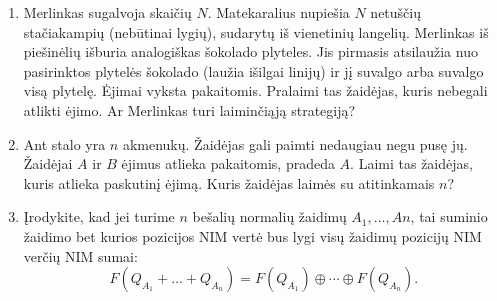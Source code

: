 \begin{enumerate}


  \item Merlinkas sugalvoja skaičių $N$. Matekaralius nupiešia $N$
    netuščių stačiakampių (nebūtinai lygių), sudarytų iš vienetinių langelių.
    Merlinkas iš piešinėlių išburia analogiškas šokolado plyteles.
    Jis pirmasis atsilaužia nuo pasirinktos plytelės šokolado (laužia išilgai
    linijų) ir jį suvalgo arba suvalgo visą plytelę. Ėjimai vyksta
    pakaitomis. Pralaimi tas žaidėjas, kuris nebegali atlikti ėjimo.  Ar
    Merlinkas turi laiminčiąją strategiją?  

  \item Ant stalo yra $n$ akmenukų. Žaidėjas gali paimti nedaugiau negu pusę
    jų. Žaidėjai $A$ ir $B$ ėjimus atlieka pakaitomis, pradeda $A$.  Laimi
    tas žaidėjas, kuris atlieka paskutinį ėjimą. Kuris žaidėjas laimės su
    atitinkamais $n$?

  \item Įrodykite, kad jei turime $n$ bešalių normalių žaidimų $A_{1},
    \ldots, A{n}$, tai suminio žaidimo bet kurios pozicijos NIM vertė bus
    lygi visų žaidimų pozicijų NIM verčių NIM sumai: $$F(Q_{A_{1}} + \ldots
    + Q_{A_{n}}) = F(Q_{A_{1}}) \oplus \cdots \oplus F(Q_{A_{n}}).$$


\end{enumerate}

